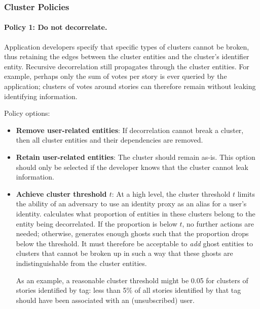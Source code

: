 \subsubsection{Cluster Policies}

\paragraph{Policy 1: Do not decorrelate.}

Application developers specify that specific types of clusters cannot be broken, thus retaining the edges between the cluster entities and the cluster's identifier entity.
Recursive decorrelation still propagates through the cluster entities. 
For example, perhaps only the sum of votes per story is ever queried by the application; clusters of
votes around stories can therefore remain without leaking identifying information.

\vspace{12pt}
\noindent Policy options:
\begin{itemize}
    \item \textbf{Remove user-related entities}: If decorrelation cannot break a cluster, then all
        cluster entities and their dependencies are removed.
    
    \item \textbf{Retain user-related entities}: The cluster should remain as-is. This option should
        only be selected if the developer knows that the cluster cannot leak information.

    \item \textbf{Achieve cluster threshold $t$}: At a high level, the cluster threshold
        $t$ limits the ability of an adversary to use an identity proxy as an alias for a user's
        identity.  \sys{} calculates what proportion of entities in these clusters belong to the
        entity being decorrelated. If the proportion is below $t$, no further actions are needed;
        otherwise, \sys{} generates enough ghosts such that the proportion drops below the
        threshold. It must therefore be acceptable to \emph{add} ghost entities to clusters that
        cannot be broken up in such a way that these ghosts are indistinguishable from the cluster
        entities. 

        As an example, a reasonable cluster threshold might be 0.05 for clusters of stories identified by
        tag: less than 5\% of all stories identified by that tag should have been associated with an
        (unsubscribed) user. 
\end{itemize}

